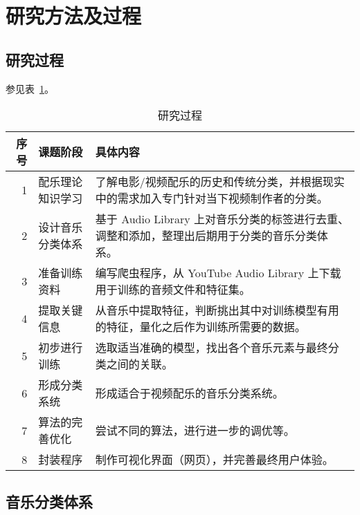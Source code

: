 \documentclass[a4paper,utf8,10pt]{article}
\begin{document}
\section{研究方法及过程}

\subsection{研究过程}

参见表~\ref{tab:process}。

\begin{table}
\caption{研究过程} \label{tab:process}
\noindent\begin{tabular}{ r | l | p{13.5cm} }
\hline
序号 & 课题阶段         & 具体内容                                                                                     \\ \hline
   1 & 配乐理论知识学习 & 了解电影/视频配乐的历史和传统分类，并根据现实中的需求加入专门针对当下视频制作者的分类。      \\ \hline
   2 & 设计音乐分类体系 & 基于 Audio Library 上对音乐分类的标签进行去重、调整和添加，整理出后期用于分类的音乐分类体系。\\ \hline
   3 & 准备训练资料     & 编写爬虫程序，从 YouTube Audio Library 上下载用于训练的音频文件和特征集。                    \\ \hline
   4 & 提取关键信息     & 从音乐中提取特征，判断挑出其中对训练模型有用的特征，量化之后作为训练所需要的数据。           \\ \hline
   5 & 初步进行训练     & 选取适当准确的模型，找出各个音乐元素与最终分类之间的关联。                                   \\ \hline
   6 & 形成分类系统     & 形成适合于视频配乐的音乐分类系统。                                                           \\ \hline
   7 & 算法的完善优化   & 尝试不同的算法，进行进一步的调优等。                                                         \\ \hline
   8 & 封装程序         & 制作可视化界面（网页），并完善最终用户体验。                                                 \\ \hline
\end{tabular}
\end{table}

\subsection{音乐分类体系}
\end{document}
